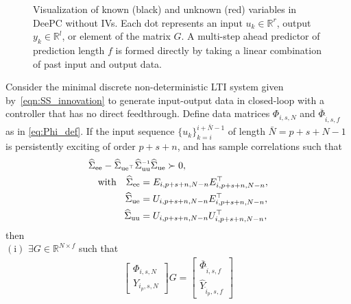 \begin{figure}[b!]
\centering

\caption{Visualization of known (black) and unknown (red) variables in \ac{DeePC} without \ac{IVs}. Each dot represents an input $u_k\in\mathbb{R}^r$, output $y_k\in\mathbb{R}^l$, or element of the matrix $G$. A multi-step ahead predictor of prediction length $f$ is formed directly by taking a linear combination of past input and output data.\\\vspace{0.75mm}}
\label{fig:regular-DeePC}
\end{figure}
%
\setcounter{thm}{0}
\begin{thm}\label{theorem:main_result}
    Consider the minimal discrete non-deterministic \ac{LTI} system given by~\eqref{eqn:SS_innovation} to generate input-output data in closed-loop with a controller that has no direct feedthrough. Define data matrices $\Phi_{i,s,N}$ and $\overline{\Phi}_{\hat{i},s,f}$ as in \eqref{eq:Phi_def}. If the input sequence $\{u_k\}_{k=i}^{i+\bar{N}-1}$ of length $\bar{N}=p+s+N-1$ %
    is persistently exciting of order $p+s+n$, and has sample correlations such that%
    \begin{alignat}{2}%
    &\widehat{\Sigma}_{\mathrm{ee}} - \widehat{\Sigma}_{\mathrm{ue}^\top} \widehat{\Sigma}_{\mathrm{uu}}\inv \widehat{\Sigma}_{\mathrm{ue}}\succ0,\span\span\label{eq:PE_corUE2}\\
    &&\text{with}\quad\widehat{\Sigma}_{\mathrm{ee}}&=E_{i,p+s+n,N-n}E_{i,p+s+n,N-n}^\top,\notag\\
    &&\widehat{\Sigma}_{\mathrm{ue}}&=U_{i,p+s+n,N-n}E_{i,p+s+n,N-n}^\top,\notag\\
    &&\widehat{\Sigma}_{\mathrm{uu}}&=U_{i,p+s+n,N-n}U_{i,p+s+n,N-n}^\top,\notag
    \end{alignat}
    then \\
    $\mathrm{(i)}$ $\exists G\in\mathbb{R}^{N\times f}$ such that
    \begin{align}\label{eq:Theorem1}
        \begin{bmatrix}
            \Phi_{i,s,N}\\Y_{i_p,s,N}
        \end{bmatrix}G =
        \begin{bmatrix}
            \overline{\Phi}_{\hat{i},s,f}\\\widehat{Y}_{\hat{i}_p,s,f}

\end{bmatrix}
\end{align}
\end{thm}
